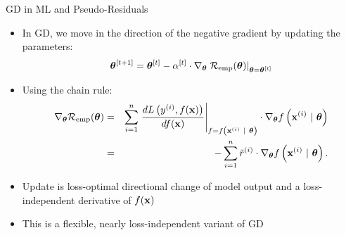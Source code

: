 \documentclass[11pt,compress,t,notes=noshow, xcolor=table]{beamer}
\begin{document}
\begin{vbframe}{GD in ML and Pseudo-Residuals}

\begin{itemize}
	\item In GD, we move in the direction of the negative gradient by updating the parameters: 
	$$
	 \bm{\theta}^{[t + 1]} = \bm{\theta}^{[t]} - \alpha^{[t]} \cdot \nabla_{\bm{\theta}} \left.\mathcal{R}_{\text{emp}}(\bm{\theta})\right|_{\bm{\theta} = \bm{\theta}^{[t]}}	
	$$
	\item Using the chain rule:
	\begin{eqnarray*}
	\nabla_{\bm{\theta}} \mathcal{R}_{\text{emp}}(\bm{\theta}) &=&\sum\limits_{i=1}^n \left.\frac{d L\left(y^{(i)}, f(\mathbf{x})\right)}{d f(\mathbf{x})} \right|_{f = f\left(\mathbf{x}^{(i)} ~|~ \bm{\theta}\right)} 
	\cdot \nabla_{\bm{\theta}} f\left(\mathbf{x}^{(i)} ~|~ \bm{\theta}\right) \\ 
	&=& - \sum\limits_{i=1}^n \tilde r^{(i)} \cdot \nabla_{\bm{\theta}} f\left(\mathbf{x}^{(i)} ~|~ \bm{\theta}\right).
	\end{eqnarray*}
	\item Update is loss-optimal directional change of model output 
        and a loss-independent derivative of $f(\mathbf{x})$
        \item This is a flexible, nearly loss-independent variant of GD
\end{itemize}	

\end{vbframe}
\end{document}
